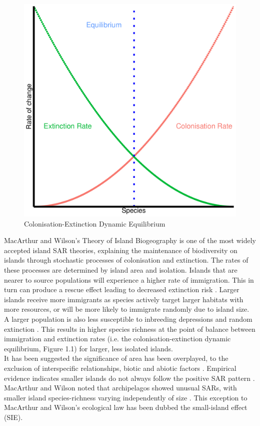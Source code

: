 \begin{figure}[htp]

\centering
\includegraphics[width=.5\textwidth]{ColonisationDynamicEquilibrium.pdf}\hfill

\caption{Colonisation-Extinction Dynamic Equilibrium}
\label{fig:figure1}

\end{figure}

\noindent MacArthur and Wilson's Theory of Island Biogeography \cite{MacArthurRobertH1967Ttoi} is one of the most widely accepted island SAR theories, explaining the maintenance of biodiversity on islands through stochastic processes of colonisation and extinction. The rates of these processes are determined by island area and isolation. Islands that are nearer to source populations will experience a higher rate of immigration. This in turn can produce a rescue effect leading to decreased extinction risk \cite{brown1977turnover}. Larger islands receive more immigrants as species actively target larger habitats with more resources, or will be more likely to immigrate randomly due to island size. A larger population is also less susceptible to inbreeding depressions and random extinction \cite{macdonald2018theory}. This results in higher species richness at the point of balance between immigration and extinction rates (i.e. the colonisation-extinction dynamic equilibrium, Figure 1.1) for larger, less isolated islands. \\

\noindent It has been suggested the significance of area has been overplayed, to the exclusion of interspecific relationships, biotic and abiotic factors \cite{abbott1974numbers}. Empirical evidence indicates smaller islands do not always follow the positive SAR pattern  \cite{triantis2006re} \cite{sfenthourakis2009habitat}. MacArthur and Wilson noted that archipelagos showed unusual SARs, with smaller island species-richness varying independently of size \cite{MacArthurRobertH1967Ttoi}. This exception to MacArthur and Wilson's ecological law has been dubbed the small-island effect (SIE). \\

